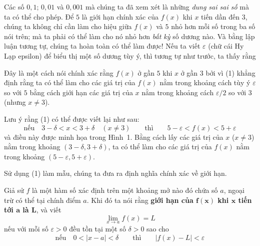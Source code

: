 \begin{minipage}[t]{366pt}
    Các số $0{,}1$; $0{,}01$ và $0{,}001$ mà chúng ta đã xem xét là những \emph{dung sai sai số} mà ta có thể cho phép. Để $5$ là giới hạn chính xác của $f(x)$ khi $x$ tiến dần đến $3$, chúng ta không chỉ cần làm cho hiệu giữa $f(x)$ và $5$ nhỏ hơn mỗi số trong ba số nói trên; mà ta phải có thể làm cho nó nhỏ hơn \emph{bất kỳ} số dương nào. Và bằng lập luận tương tự, chúng ta hoàn toàn có thể làm được! Nếu ta viết $\varepsilon$ (chữ cái Hy Lạp epsilon) để biểu thị một số dương tùy ý, thì tương tự như trước, ta thấy rằng

    \vspace{2pt}
    \noindent
    \vspace{2pt}

    Đây là một cách nói chính xác rằng $f(x)$ ở gần $5$ khi $x$ ở gần $3$ bởi vì (1) khẳng định rằng ta có thể làm cho các giá trị của $f(x)$ nằm trong khoảng cách tùy ý $\varepsilon$ so với $5$ bằng cách giới hạn các giá trị của $x$ nằm trong khoảng cách $\varepsilon/2$ so với $3$ (nhưng $x \neq 3$).

    Lưu ý rằng (1) có thể được viết lại như sau:
    {\setlength{\abovedisplayskip}{4pt}\setlength{\belowdisplayskip}{4pt}
    \[
    \text{nếu} \quad 3 - \delta < x < 3 + \delta \quad (x \neq 3) \qquad \text{thì} \qquad 5 - \varepsilon < f(x) < 5 + \varepsilon
    \]}
    và điều này được minh họa trong Hình~1. Bằng cách lấy các giá trị của $x$ ($x \neq 3$) nằm trong khoảng $(3 - \delta, 3 + \delta)$, ta có thể làm cho các giá trị của $f(x)$ nằm trong khoảng $(5 - \varepsilon, 5 + \varepsilon)$.

    Sử dụng (1) làm mẫu, chúng ta đưa ra định nghĩa chính xác về giới hạn.

    \vspace{1pt}
    \begin{tcolorbox}[
      colback=white,
      colframe=stewartred,
      boxrule=0.9pt,
      sharp corners,
      boxsep=0pt,
      left=8pt, right=8pt,
      top=7pt, bottom=7pt
    ]
    \setlength{\abovedisplayskip}{4.5pt}
    \setlength{\belowdisplayskip}{4.5pt}
    \noindent
    \quad
    Giả sử $f$ là một hàm số xác định trên một khoảng mở nào đó chứa số $a$, ngoại trừ có thể tại chính điểm $a$. Khi đó ta nói rằng \textbf{giới hạn của $\boldsymbol{f(x)}$ khi $\boldsymbol{x}$ tiến tới $\boldsymbol{a}$ là $\boldsymbol{L}$}, và viết
    \[
    \lim_{x \to a} f(x) = L
    \]
    nếu với mỗi số $\varepsilon > 0$ đều tồn tại một số $\delta > 0$ sao cho
    \[
    \text{nếu} \quad 0 < |x - a| < \delta \qquad \text{thì} \qquad |f(x) - L| < \varepsilon
    \]
    \end{tcolorbox}
    \vspace{1pt}


\end{minipage}
